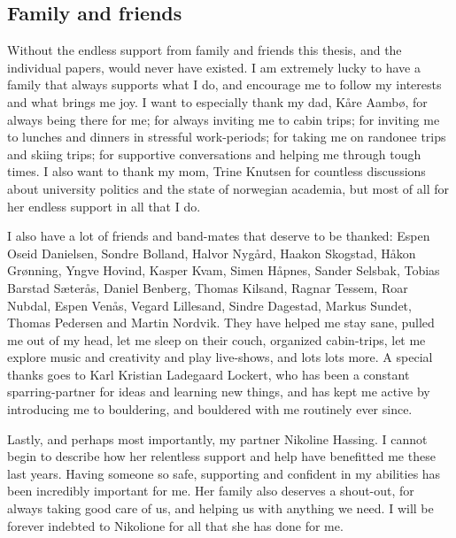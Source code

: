 \subsection*{Family and friends}

Without the endless support from family and friends this thesis, and the individual papers, would never have existed. I am extremely lucky to have a family that always supports what I do, and encourage me to follow my interests and what brings me joy. I want to especially thank my dad, Kåre Aambø, for always being there for me; for always inviting me to cabin trips; for inviting me to lunches and dinners in stressful work-periods; for taking me on randonee trips and skiing trips; for supportive conversations and helping me through tough times. I also want to thank my mom, Trine Knutsen for countless discussions about university politics and the state of norwegian academia, but most of all for her endless support in all that I do. 

I also have a lot of friends and band-mates that deserve to be thanked: Espen Oseid Danielsen, Sondre Bolland, Halvor Nygård, Haakon Skogstad, Håkon Grønning, Yngve Hovind, Kasper Kvam, Simen Håpnes, Sander Selsbak, Tobias Barstad Sæterås, Daniel Benberg, Thomas Kilsand, Ragnar Tessem, Roar Nubdal, Espen Venås, Vegard Lillesand, Sindre Dagestad, Markus Sundet, Thomas Pedersen and Martin Nordvik. They have helped me stay sane, pulled me out of my head, let me sleep on their couch, organized cabin-trips, let me explore music and creativity and play live-shows, and lots lots more. A special thanks goes to Karl Kristian Ladegaard Lockert, who has been a constant sparring-partner for ideas and learning new things, and has kept me active by introducing me to bouldering, and bouldered with me routinely ever since. 

Lastly, and perhaps most importantly, my partner Nikoline Hassing. I cannot begin to describe how her relentless support and help have benefitted me these last years. Having someone so safe, supporting and confident in my abilities has been incredibly important for me. Her family also deserves a shout-out, for always taking good care of us, and helping us with anything we need. I will be forever indebted to Nikolione for all that she has done for me. 


